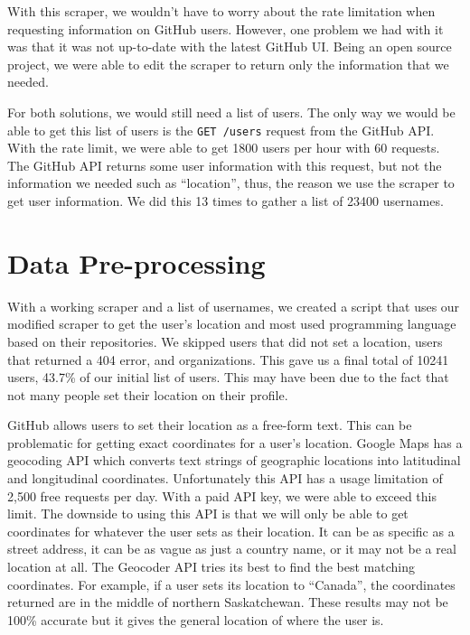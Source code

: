 \documentclass[11pt]{article}
\begin{document}
With this scraper, we wouldn’t have to worry about the rate limitation when requesting information on GitHub users. However, one problem we had with it was that it was not up-to-date with the latest GitHub UI. Being an open source project, we were able to edit the scraper to return only the information that we needed.

For both solutions, we would still need a list of users. The only way we would be able to get this list of users is the \texttt{GET /users} request from the GitHub API. With the rate limit, we were able to get 1800 users per hour with 60 requests. The GitHub API returns some user information with this request, but not the information we needed such as “location”, thus, the reason we use the scraper to get user information. We did this 13 times to gather a list of 23400 usernames.

\section{Data Pre-processing}

With a working scraper and a list of usernames, we created a script that uses our modified scraper to get the user’s location and most used programming language based on their repositories. We skipped users that did not set a location, users that returned a 404 error, and organizations. This gave us a final total of 10241 users, 43.7\% of our initial list of users. This may have been due to the fact that not many people set their location on their profile.

GitHub allows users to set their location as a free-form text. This can be problematic for getting exact coordinates for a user's location. Google Maps has a geocoding API which converts text strings of geographic locations into latitudinal and longitudinal coordinates. Unfortunately this API has a usage limitation of 2,500 free requests per day. With a paid API key, we were able to exceed this limit. The downside to using this API is that we will only be able to get coordinates for whatever the user sets as their location. It can be as specific as a street address, it can be as vague as just a country name, or it may not be a real location at all. The Geocoder API tries its best to find the best matching coordinates. For example, if a user sets its location to “Canada”, the coordinates returned are in the middle of northern Saskatchewan. These results may not be 100\% accurate but it gives the general location of where the user is.
\end{document}
